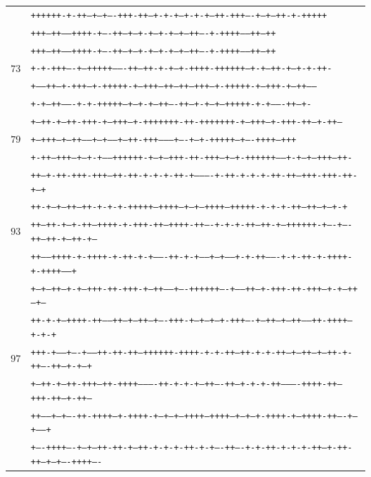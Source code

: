\documentclass[10pt]{article}
\begin{document}
\begin{center}
\begin{tabular}{rl}
&\texttt{++++++-+-++--+--+----+++-++--+-+-+--+-+-+--++-+++----+--+--++-+-+++++}\\
&\texttt{+++--++-----++++-+----++---+---+-+--+-+---+---++----+-++++-----++--++}\\
&\texttt{+++--++-----++++-+----++---+---+-+--+-+---+---++----+-++++-----++--++}\\
\hline
$73$&\texttt{+-+-+++----+---+++++-------++---++-+-+--+-++++-++++++--+-+--++-+--+-+-++-}\\
&\texttt{+-----++--+-+++--+-+++++-+---+++--++--++--+++---+-+++++-+--+++-+--++-----}\\
&\texttt{+-+--++-------+-+-+++++--+--+-+--++----++--+-+--+--+++++-+-+-------++--+-}\\
&\texttt{+---++-+--++-+++-+--+++---+-+++++++-++-+++++++-+---+++--+-+++-++--+-++---}\\
\hline
$79$&\texttt{+---+++---+--++-----+---+-----+--++-+++---------+----+--+-+++++--+----++++--+++}\\
&\texttt{+-++--+++--+--+-+-----++++++-+--+--+++-++-+++--+--+-++++++-----+-+--+--+++--++-}\\
&\texttt{++---+-++-+++-+++--++-++-+-+-+-++-+----------+-++-+-+-+-++-++--+++-+++-++-+---+}\\
&\texttt{++-+--+---++---++-+-+-+-+++++---++++--+--+--++++---+++++-+-+-+-++---++---+--+-+}\\
\hline
$93$&\texttt{++--++-+--+-++--++++-+-+++-++--++++-++----+-+-+-++---++-+---++++++-+----+----++--++-+--++-+--}\\
&\texttt{++-----++++-+-++++-+-++-+-+-------++-+-+-----+--+-----+-+-++-------+-+-++-+-++++-+-++++-----+}\\
&\texttt{+---+---++--+-+---+++-++-+++-+--++-----+----++++++----+-----++--+-+++-++-+++---+-+--++---+---}\\
&\texttt{++-+-+--++++-++------++--+--++---+----+++-+--+--+--+-+++----+---++--+--++------++-++++--+-+-+}\\
\hline
$97$&\texttt{+++-+-----+----+------++-++-++---++++++-++++-+-+-++---++-+-+-++---+--++--+--++-+-++----++--+-+--+}\\
&\texttt{+--++-+--++-+++--++-++++----------++-+-+-+---++----++---+-+-+-++----------++++-++--+++-++--+-++--}\\
&\texttt{++-----+---+----++-++++---+-++++-+---+---+--++++--++++--+---+---+-++++-+---++++-++----+---+-----+}\\
&\texttt{+----++++----+--+---++-++-+--++-+-+-+-++-+-+----++----+-+-++-+-+-+-++--+-++-++---+--+----++++----}\\

\end{tabular}
\end{center}
\end{document}
